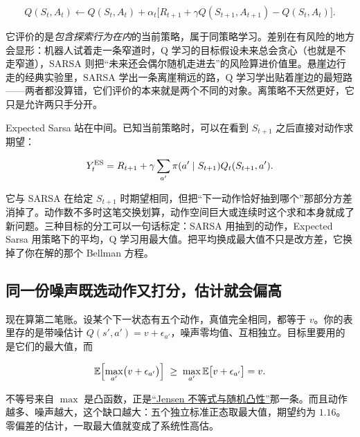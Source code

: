 \[
Q(S_t,A_t)
\leftarrow
Q(S_t,A_t)+\alpha_t\bigl[R_{t+1}+\gamma Q(S_{t+1},A_{t+1})-Q(S_t,A_t)\bigr].
\]

它评价的是\emph{包含探索行为在内}的当前策略，属于同策略学习。差别在有风险的地方会显形：机器人试着走一条窄道时，Q 学习的目标假设未来总会贪心（也就是不走窄道），SARSA 则把``未来还会偶尔随机走进去''的风险算进价值里。悬崖边行走的经典实验里，SARSA 学出一条离崖稍远的路，Q 学习学出贴着崖边的最短路——两者都没算错，它们评价的本来就是两个不同的对象。离策略不天然更好，它只是允许两只手分开。

Expected Sarsa 站在中间。已知当前策略时，可以在看到 \(S_{t+1}\) 之后直接对动作求期望：

\[
Y_t^{\mathrm{ES}}=R_{t+1}+\gamma\sum_{a'}\pi(a'\mid S_{t+1})Q_t(S_{t+1},a').
\]

它与 SARSA 在给定 \(S_{t+1}\) 时期望相同，但把``下一动作恰好抽到哪个''那部分方差消掉了。动作数不多时这笔交换划算，动作空间巨大或连续时这个求和本身就成了新问题。三种目标的分工可以一句话标定：SARSA 用抽到的动作，Expected Sarsa 用策略下的平均，Q 学习用最大值。把平均换成最大值不只是改方差，它换掉了你在解的那个 Bellman 方程。

\subsection{同一份噪声既选动作又打分，估计就会偏高}

现在算第二笔账。设某个下一状态有五个动作，真值完全相同，都等于 \(v\)。你的表里存的是带噪估计 \(Q(s',a')=v+\epsilon_{a'}\)，噪声零均值、互相独立。目标里要用的是它们的最大值，而

\[
\mathbb{E}\Bigl[\max_{a'}\bigl(v+\epsilon_{a'}\bigr)\Bigr]
\;\ge\;
\max_{a'}\mathbb{E}\bigl[v+\epsilon_{a'}\bigr]
=v.
\]

不等号来自 \(\max\) 是凸函数，正是\hyperref[sec:05-Probability/07-Transforms-and-Bounds/03]{``Jensen 不等式与随机凸性''}那一条。而且动作越多、噪声越大，这个缺口越大：五个独立标准正态取最大值，期望约为 \(1.16\)。零偏差的估计，一取最大值就变成了系统性高估。

\begin{center}
\end{center}

